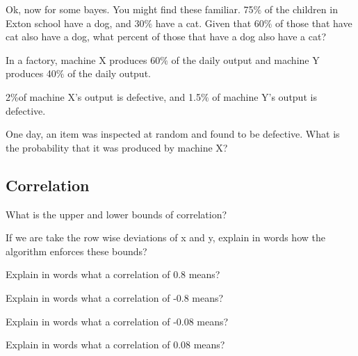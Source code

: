 \documentclass[11pt]{article}
\begin{document}
Ok, now for some bayes. You might find these familiar. 75$\%$ of the children in Exton school have a dog, and 30$\%$ have a cat. Given that 60$\%$ of those that have cat also have a dog, what percent of those that have a dog also have a cat?
\newline 
\newline
\newline 




In a factory, machine X produces 60$\%$ of the daily output and machine Y produces 40$\%$ of the daily output.

2$\%$of machine X's output is defective, and 1.5$\%$ of machine Y's output is defective.

One day, an item was inspected at random and found to be defective. What is the probability that it was produced by machine X?


\subsection{Correlation}


What is the upper and lower bounds of correlation? 
\newline  
\newline
\newline 

If we are take the row wise deviations of x and y, explain in words how the algorithm enforces these bounds? 
\newline  
\newline
\newline 


Explain in words what a correlation of 0.8 means? 
\newline  
\newline
\newline 


Explain in words what a correlation of -0.8 means? 
\newline  
\newline
\newline 




Explain in words what a correlation of -0.08 means? 
\newline  
\newline
\newline 



Explain in words what a correlation of 0.08 means? 
\newline  
\newline
\newline 
\end{document}
